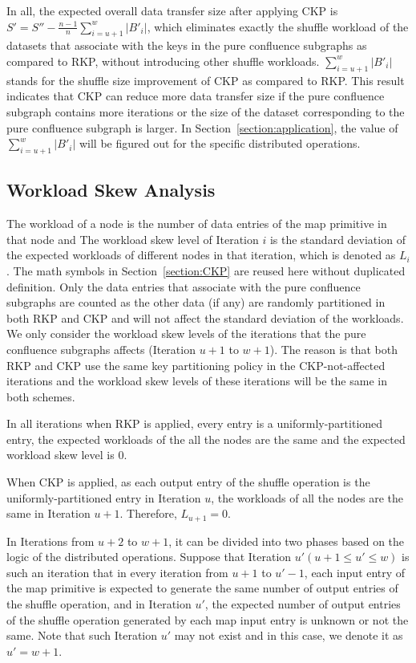 \documentclass[10pt,journal,compsoc]{IEEEtran}
\begin{document}
In all, the expected overall data transfer size after applying CKP 
is $S'=S''- \frac{n-1}{n}\sum_{i=u+1}^w |B'_i|$, 
which eliminates exactly the shuffle workload of the datasets that associate with the keys in the pure confluence subgraphs as compared to RKP, without introducing other shuffle workloads. 
$\sum_{i=u+1}^w |B'_i|$ stands for the shuffle size improvement of CKP as compared to RKP.
This result indicates that CKP can reduce more data transfer size 
if the pure confluence subgraph contains more iterations 
or the size of the dataset corresponding to the pure confluence subgraph is larger. 
In Section~\ref{section:application}, the value of $\sum_{i=u+1}^w |B'_i|$ will be figured out for the specific distributed operations.


\subsection{Workload Skew Analysis}\label{section:skew}
The workload of a node is the number of data entries of the map primitive in that node and 
The workload skew level of Iteration $i$ is the standard deviation of the expected workloads of different nodes in that iteration, which is denoted as $L_i$. 
The math symbols in Section~\ref{section:CKP} are reused here without duplicated definition. 
Only the data entries that associate with the pure confluence subgraphs are counted as the other data (if any) are randomly partitioned in both RKP and CKP and will not affect the standard deviation of the workloads.
We only consider the workload skew levels of the iterations that the pure confluence subgraphs affects (Iteration $u+1$ to $w+1$).
The reason is that both RKP and CKP use the same key partitioning policy in the CKP-not-affected iterations and the workload skew levels of these iterations will be the same in both schemes.


In all iterations when RKP is applied, every entry is a uniformly-partitioned entry, the expected workloads of the all the nodes are the same and the expected workload skew level is 0. 

When CKP is applied, as each output entry of the shuffle operation is the uniformly-partitioned entry in Iteration $u$, the workloads of all the nodes are the same in Iteration $u+1$. 
Therefore, $L_{u+1}=0$.

In Iterations from $u+2$ to $w+1$, 
it can be divided into two phases based on the logic of the distributed operations. 
Suppose that Iteration $u' (u+1 \leq u' \leq w)$ is such an iteration that in every iteration from $u+1$ to $u'-1$, each input entry of the map primitive is expected to generate the same number of output entries of the shuffle operation, and in Iteration $u'$, the expected number of output entries of the shuffle operation generated by each map input entry is unknown or not the same. 
Note that such Iteration $u'$ may not exist and in this case, we denote it as $u'=w+1$. 
\end{document}
